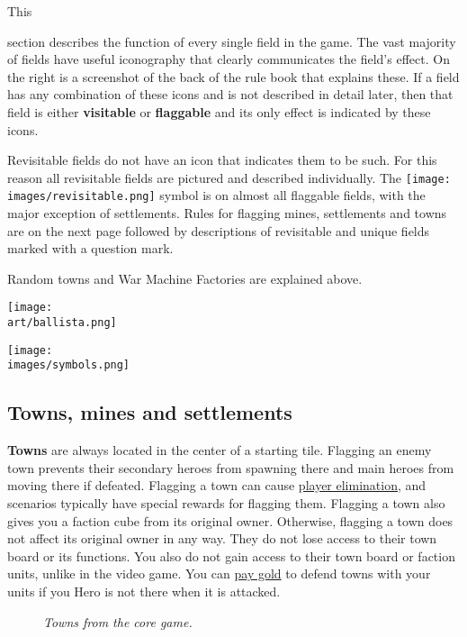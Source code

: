 
\begin{multicols*}{2}

\hypertarget{All}{This} section describes the function of every single field in the game.
The vast majority of fields have useful iconography that clearly communicates the field's effect.
On the right is a screenshot of the back of the rule book that explains these.
If a field has any combination of these icons and is not described in detail later, then that field is either \textbf{visitable} or \textbf{flaggable} and its only effect is indicated by these icons.\par
Revisitable fields do not have an icon that indicates them to be such.
For this reason all revisitable fields are pictured and described individually.
The \texttt{[image: \\images/revisitable.png]} symbol is on almost all flaggable fields, with the major exception of settlements.
Rules for flagging mines, settlements and towns are on the next page followed by descriptions of revisitable and unique fields marked with a question mark.\par
Random towns and War Machine Factories are explained above.

\vfill
\begin{center}
  \hspace{-14em}
  \texttt{[image: \\art/ballista.png]}
\end{center}

\begin{center}
  \texttt{[image: \\images/symbols.png]}
\end{center}

\clearpage
\subsection*{Towns, mines and settlements}
\textbf{Towns} are always located in the center of a starting tile.
Flagging an enemy town prevents their secondary heroes from spawning there and main heroes from moving there if defeated.
Flagging a town can cause \hyperlink{End}{player elimination}, and scenarios typically have special rewards for flagging them.
Flagging a town also gives you a faction cube from its original owner.
Otherwise, flagging a town does not affect its original owner in any way.
They do not lose access to their town board or its functions.
You also do not gain access to their town board or faction units, unlike in the video game.
You can \hyperlink{Town}{pay gold} to defend towns with your units if you Hero is not there when it is attacked.\\
\begin{figure}[h]
\centering
{}
\caption{\textit{Towns from the core game.}}
\end{figure}


\end{multicols*}
